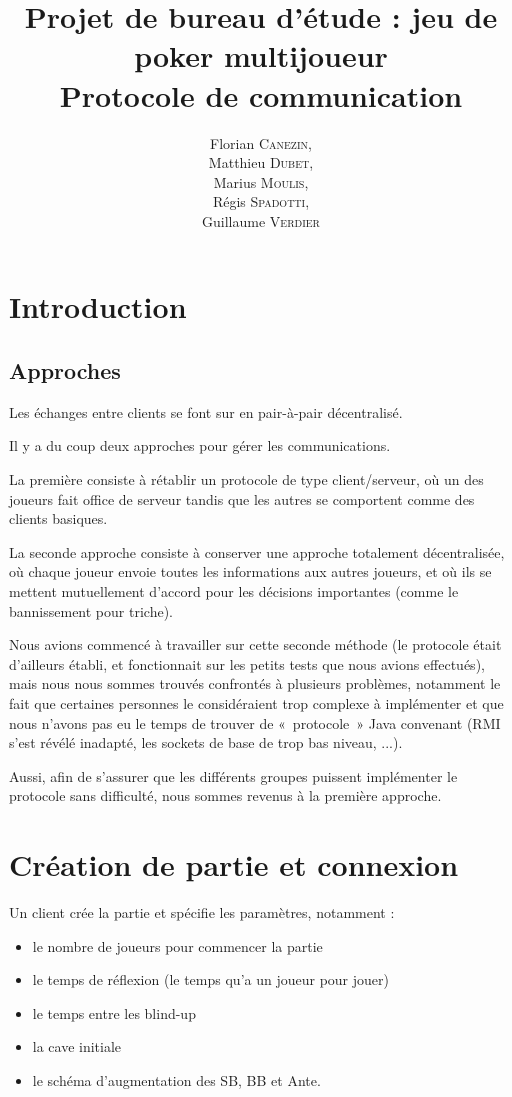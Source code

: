 \documentclass[a4paper]{article}
\title{Projet de bureau d'étude : jeu de poker multijoueur\\Protocole de communication}
\author{
	Florian \textsc{Canezin},\\
	Matthieu \textsc{Dubet},\\
	Marius \textsc{Moulis},\\
	Régis \textsc{Spadotti},\\
	Guillaume \textsc{Verdier}
}
\date{}
\begin{document}
\maketitle
\clearpage

\tableofcontents
\clearpage

\section{Introduction}

\subsection{Approches}

Les échanges entre clients se font sur en pair-à-pair décentralisé.

Il y a du coup deux approches pour gérer les communications.

La première consiste à rétablir un protocole de type client/serveur, où un des joueurs fait office de serveur tandis que les autres se comportent comme des clients basiques.

La seconde approche consiste à conserver une approche totalement décentralisée, où chaque joueur envoie toutes les informations aux autres joueurs, et où ils se mettent mutuellement d'accord pour les décisions importantes (comme le bannissement pour triche).

Nous avions commencé à travailler sur cette seconde méthode (le protocole était d'ailleurs établi, et fonctionnait sur les petits tests que nous avions effectués), mais nous nous sommes trouvés confrontés à plusieurs problèmes, notamment le fait que certaines personnes le considéraient trop complexe à implémenter et que nous n'avons pas eu le temps de trouver de «~protocole~» Java convenant (RMI s'est révélé inadapté, les sockets de base de trop bas niveau, ...).

Aussi, afin de s'assurer que les différents groupes puissent implémenter le protocole sans difficulté, nous sommes revenus à la première approche.

\section{Création de partie et connexion}

Un client crée la partie et spécifie les paramètres, notamment :
\begin{itemize}
	\item le nombre de joueurs pour commencer la partie
	\item le temps de réflexion (le temps qu'a un joueur pour jouer)
	\item le temps entre les blind-up
	\item la cave initiale
	\item le schéma d'augmentation des SB, BB et Ante.
\end{itemize}
\end{document}
